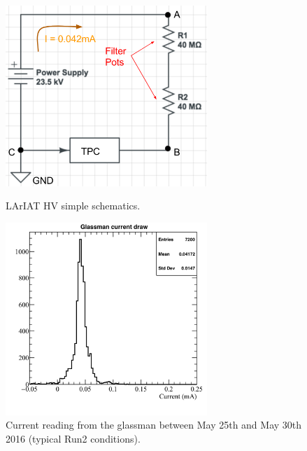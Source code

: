 \begin{figure}[hp]
\centering
\begin{minipage}{0.45\textwidth}
\centering
\includegraphics[width=3in]{images/CircuitLArIAT.png}
\caption{LArIAT HV simple schematics.}
\label{fig:circuit}
\end{minipage}\hfill
\begin{minipage}{0.45\textwidth}
\centering
\includegraphics[width=3in]{images/glassman_current_20160525-30.png}
\caption{Current reading from the glassman between May 25th and May 30th 2016 (typical Run2 conditions).}
\label{fig:currentMeasurement}
\end{minipage}
\end{figure}

